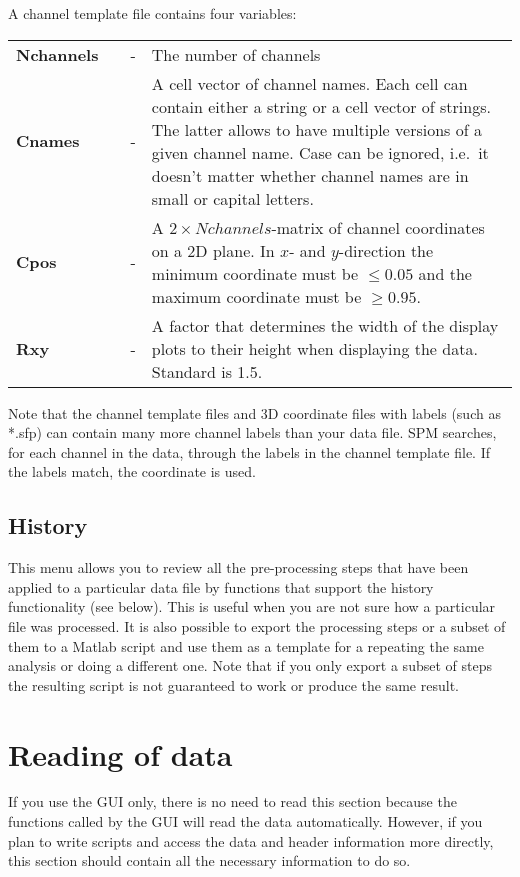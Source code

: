 A channel template file contains four variables:\\

\begin{tabular}{llcp{9cm}}
{\bf Nchannels} & &  - & The number of channels\\
{\bf Cnames}&  & - & A cell vector of channel names. Each cell can
contain either a string or a cell vector of strings. The latter allows
to have multiple versions of a given channel name. Case can be
ignored, i.e.~it doesn't matter whether channel names are in small or
capital letters.\\
{\bf Cpos} & & - & A $2 \times Nchannels$-matrix of channel
coordinates on a 2D plane. In $x$- and $y$-direction the minimum
coordinate must be $\leq 0.05$ and the maximum coordinate
must be $\geq 0.95$. \\ 
{\bf Rxy} & & - & A factor that determines the width of the display
plots to their height when displaying the data. Standard is 1.5. \\
\end{tabular}

Note that the channel template files and 3D coordinate files with labels
(such as *.sfp) can contain many more channel
labels than your data file. SPM searches, for each channel in the
data, through the labels in the channel template file. If the labels
match, the coordinate is used. 

\subsection{History}
This menu allows you to review all the pre-processing steps that have been applied
to a particular data file by functions that support the history functionality (see below).
This is useful when you are not sure how a particular file was processed. It is also possible
to export the processing steps or a subset of them to a Matlab script and use them as a template
for a repeating the same analysis or doing a different one. Note that if you only export a subset
of steps the resulting script is not guaranteed to work or produce the same result.

\section{Reading of data}
\label{sec:load}
If you use the GUI only, there is no need to read this
section because the functions called by the GUI will read the data
automatically. However, if you plan to write scripts and access the
data and header information more directly, this section should contain
all the necessary information to do so. 


